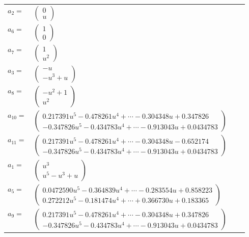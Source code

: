 \documentclass[1p]{elsarticle_modified}
\theoremstyle{definition}
\begin{document}
\begin{tabular}{m{7pt} m{180pt} m{7pt} m{180pt} }
\flushright $a_{2}=$&$\begin{pmatrix}0\\u\end{pmatrix}$ \\
\flushright $a_{6}=$&$\begin{pmatrix}1\\0\end{pmatrix}$ \\
\flushright $a_{7}=$&$\begin{pmatrix}1\\u^2\end{pmatrix}$ \\
\flushright $a_{3}=$&$\begin{pmatrix}- u\\- u^3+u\end{pmatrix}$ \\
\flushright $a_{8}=$&$\begin{pmatrix}- u^2+1\\u^2\end{pmatrix}$ \\
\flushright $a_{10}=$&$\begin{pmatrix}0.217391 u^{5}-0.478261 u^{4}+\cdots-0.304348 u+0.347826\\-0.347826 u^{5}-0.434783 u^{4}+\cdots-0.913043 u+0.0434783\end{pmatrix}$ \\
\flushright $a_{11}=$&$\begin{pmatrix}0.217391 u^{5}-0.478261 u^{4}+\cdots-0.304348 u-0.652174\\-0.347826 u^{5}-0.434783 u^{4}+\cdots-0.913043 u+0.0434783\end{pmatrix}$ \\
\flushright $a_{1}=$&$\begin{pmatrix}u^3\\u^5- u^3+u\end{pmatrix}$ \\
\flushright $a_{5}=$&$\begin{pmatrix}0.0472590 u^{5}-0.364839 u^{4}+\cdots-0.283554 u+0.858223\\0.272212 u^{5}-0.181474 u^{4}+\cdots+0.366730 u+0.183365\end{pmatrix}$ \\
\flushright $a_{9}=$&$\begin{pmatrix}0.217391 u^{5}-0.478261 u^{4}+\cdots-0.304348 u+0.347826\\-0.347826 u^{5}-0.434783 u^{4}+\cdots-0.913043 u+0.0434783\end{pmatrix}$ \\

\end{tabular}
\end{document}

